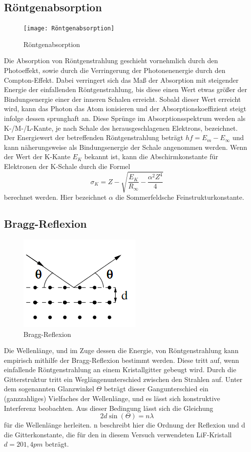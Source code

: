 \subsection{Röntgenabsorption}
\begin{figure}[h]
    \centering
    \texttt{[image: Röntgenabsorption]}
    \caption{Röntgenabsorption}
\end{figure}
Die Absorption von Röntgenstrahlung geschieht vornehmlich durch den Photoeffekt, sowie durch die Verringerung der Photonenenergie durch den Compton-Effekt. Dabei verringert sich das Maß der Absorption mit steigender Energie der einfallenden Röntgenstrahlung, bis diese einen Wert etwas größer der Bindungsenergie einer der inneren Schalen erreicht. Sobald dieser Wert erreicht wird, kann das Photon das Atom ionisieren und der Absorptionskoeffizient steigt infolge dessen sprunghaft an.
Diese Sprünge im Absorptionsspektrum werden als K-/M-/L-Kante, je nach Schale des herausgeschlagenen Elektrons, bezeichnet. Der Energiewert der betreffenden Röntgenstrahlung beträgt $hf=E_m-E_{\infty}$ und kann näherungsweise als Bindungsenergie der Schale angenommen werden. 
Wenn der Wert der K-Kante $E_K$ bekannt ist, kann die Abschirmkonstante für Elektronen der K-Schale durch die Formel
\begin{equation}
\sigma_K=Z-\sqrt{\frac{E_K}{R_{\infty}}-\frac{\alpha^2Z^4}{4}}
\end{equation}
berechnet werden. Hier bezeichnet $\alpha$ die Sommerfeldsche Feinstrukturkonstante. 
\subsection{Bragg-Reflexion}
\begin{figure}[h]
    \centering
    \includegraphics{Bragg-Reflexion}
    \caption{Bragg-Reflexion}
\end{figure}
Die Wellenlänge, und im Zuge dessen die Energie, von Röntgenstrahlung kann empirisch mithilfe der Bragg-Reflexion bestimmt werden. Diese tritt auf, wenn einfallende Röntgenstrahlung an einem Kristallgitter gebeugt wird. Durch die Gitterstruktur tritt ein Weglängenunterschied zwischen den Strahlen auf. Unter dem sogenannten Glanzwinkel $\Theta$ beträgt dieser Gangunterschied ein (ganzzahliges) Vielfaches der Wellenlänge, und es lässt sich konstruktive Interferenz beobachten. Aus dieser Bedingung lässt sich die Gleichung
\begin{equation}
2d\sin(\Theta)=n\lambda
\end{equation}
für die Wellenlänge herleiten. n beschreibt hier die Ordnung der Reflexion und d die Gitterkonstante, die für den in diesem Versuch verwendeten LiF-Kristall $d=201,4 pm$ beträgt.
